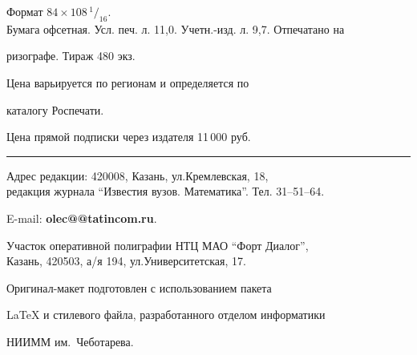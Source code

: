 Формат $84\times 108 \,^1/_{16}.$\\


Бумага офсетная. Усл. печ. л. 11,0. Учетн.-изд. л. 9,7. Отпечатано на 


ризографе. Тираж 480 экз. 





\noindent Цена варьируется по регионам и определяется по 


каталогу Роспечати. 





\noindent Цена прямой подписки через издателя  11\,000  руб. 


\bigskip


\hrule


\bigskip


\noindent Адрес редакции: 420008, Казань, ул.Кремлевская, 18,\\  


редакция журнала ``Известия вузов. Математика''. Тел. 31--51--64.





\noindent E-mail: {\bf olec@@tatincom.ru}. \par


\bigskip 


\noindent Участок оперативной полиграфии НТЦ МАО  ``Форт Диалог'', \\


Казань, 420503, а/я 194, ул.Университетская, 17. \par


\bigskip


\noindent Оригинал-макет подготовлен с использованием пакета


\AmS\LaTeX{} и стилевого файла, разработанного отделом информатики


НИИММ им.~Чеботарева.








